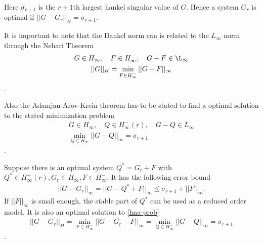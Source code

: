 Here \(\sigma_{r+1}\) is the \(r+1\)th largest hankel singular value of \(G\).
Hence a system \(G_r\) is optimal if \(||G - G_r||_H = \sigma_{r+1}\).

It is important to note that the Hankel norm can is related to the \(L_{\infty}\) norm through the Nehari Theorem
\begin{gather}
G \in H_{\infty}, \quad F \in H_{\infty}^-, \quad G - F \in \L_{\infty} \\
||G||_H = \min_{F \in H^{-}_{\infty}} ||G - F||_{\infty}
\end{gather}.

Also the Adamjan-Arov-Krein theorem has to be stated to find a optimal solution to the stated minimization problem
\begin{gather}
G \in H_{\infty}, \quad Q \in H_{\infty}^-(r), \quad G - Q \in L_{\infty} \\
\min_{Q \in H_{\infty}^{-}} ||G-Q||_{\infty} = \sigma_{r+1}
\end{gather}
.

Suppose there is an optimal system \(Q^{*} = G_r + F\) with \(Q^{*}  \in H_{\infty}^-(r), G_r \in H_{\infty}, F \in H_{\infty}^-\).
It has the following error bound
\begin{gather}
||G - G_r||_{\infty} = ||G - Q^{*} + F||_{\infty} \leq \sigma_{r+1} + ||F||_{\infty}. \label{fmin}
\end{gather}
If \(||F||_{\infty}\) is small enough, the stable part of \(Q^{*}\) can be used as a reduced order model.
It is also an optimal solution to \ref{hna-prob}
\begin{gather}
||G - G_r||_H = \min_{F \in H^{-}_{\infty}} ||G - G_r - F||_{\infty} = \min_{Q \in H_{\infty}^{-}} ||G-Q||_{\infty} = \sigma_{r+1}
\end{gather}
.

\cite{sandberg}

